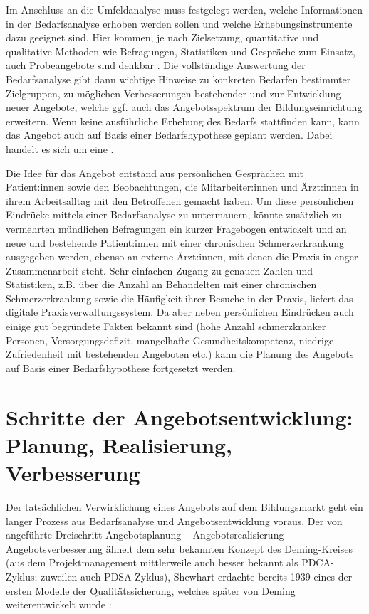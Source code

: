 \documentclass[
  twoside,
  parskip=half-,
]{scrreprt}
\begin{document}
Im Anschluss an die Umfeldanalyse muss festgelegt werden, welche Informationen in der Bedarfsanalyse erhoben werden sollen und welche Erhebungsinstrumente dazu geeignet sind. Hier kommen, je nach Zielsetzung, quantitative und qualitative Methoden wie Befragungen, Statistiken und Gespräche zum Einsatz, auch Probeangebote sind denkbar \autocite[vgl.][14]{kos}. Die vollständige Auswertung der Bedarfsanalyse gibt dann wichtige Hinweise zu konkreten Bedarfen bestimmter Zielgruppen, zu möglichen Verbesserungen bestehender und zur Entwicklung neuer Angebote, welche ggf. auch das Angebotsspektrum der Bildungseinrichtung erweitern. Wenn keine ausführliche Erhebung des Bedarfs stattfinden kann, kann das Angebot auch auf Basis einer Bedarfshypothese geplant werden. Dabei handelt es sich um eine .

\begin{praxis}
  Die Idee für das Angebot entstand aus persönlichen Gesprächen mit Patient:innen sowie den Beobachtungen, die Mitarbeiter:innen und Ärzt:innen in ihrem Arbeitsalltag mit den Betroffenen gemacht haben. Um diese persönlichen Eindrücke mittels einer Bedarfsanalyse zu untermauern, könnte zusätzlich zu vermehrten mündlichen Befragungen ein kurzer Fragebogen entwickelt und an neue und bestehende Patient:innen mit einer chronischen Schmerzerkrankung ausgegeben werden, ebenso an externe Ärzt:innen, mit denen die Praxis in enger Zusammenarbeit steht. Sehr einfachen Zugang zu genauen Zahlen und Statistiken, z.B. über die Anzahl an Behandelten mit einer chronischen Schmerzerkrankung sowie die Häufigkeit ihrer Besuche in der Praxis, liefert das digitale Praxisverwaltungssystem. Da aber neben persönlichen Eindrücken auch einige gut begründete Fakten bekannt sind (hohe Anzahl schmerzkranker Personen, Versorgungsdefizit, mangelhafte Gesundheitskompetenz, niedrige Zufriedenheit mit bestehenden Angeboten etc.) kann die Planung des Angebots auf Basis einer Bedarfshypothese fortgesetzt werden.
\end{praxis}
    

\section{Schritte der Angebotsentwicklung: Planung, Realisierung, Verbesserung}

Der tatsächlichen Verwirklichung eines Angebots auf dem Bildungsmarkt geht ein langer Prozess aus Bedarfsanalyse und Angebotsentwicklung voraus. Der von \citeauthor{schlutz} angeführte Dreischritt Angebotsplanung -- Angebotsrealisierung -- Angebotsverbesserung ähnelt dem sehr bekannten Konzept des Deming-Kreises  (aus dem Projektmanagement mittlerweile auch besser bekannt als PDCA-Zyklus; zuweilen auch PDSA-Zyklus), Shewhart erdachte bereits 1939 eines der ersten Modelle der Qualitätssicherung, welches später von Deming weiterentwickelt wurde \autocite[vgl.][6]{PDCA}:
\end{document}
